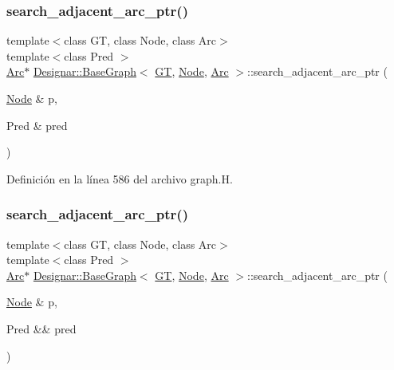 \subsubsection{\texorpdfstring{search\+\_\+adjacent\+\_\+arc\+\_\+ptr()}{search\_adjacent\_arc\_ptr()}\hspace{0.1cm}{\footnotesize\ttfamily [1/2]}}
{\footnotesize\ttfamily template$<$class GT, class Node, class Arc$>$ \\
template$<$class Pred $>$ \\
\hyperlink{namespace_designar_a3f55fb5513d62ff47cbc8f72b8e95d6f}{Arc}$\ast$ \hyperlink{class_designar_1_1_base_graph}{Designar\+::\+Base\+Graph}$<$ \hyperlink{demo-buildgraph_8_c_a3001c40d2c31ca87ed96cd7d1334a55e}{GT}, \hyperlink{namespace_designar_a5af326c65aa2bd26b26c410f2030d09e}{Node}, \hyperlink{namespace_designar_a3f55fb5513d62ff47cbc8f72b8e95d6f}{Arc} $>$\+::search\+\_\+adjacent\+\_\+arc\+\_\+ptr (\begin{DoxyParamCaption}\item[{\hyperlink{namespace_designar_a5af326c65aa2bd26b26c410f2030d09e}{Node} \&}]{p,  }\item[{Pred \&}]{pred }\end{DoxyParamCaption})\hspace{0.3cm}{\ttfamily [inline]}}



Definición en la línea 586 del archivo graph.\+H.

\mbox{\label{class_designar_1_1_base_graph_aac7ed362d5f21fcc6e583d4b9e03babb}} 
\subsubsection{\texorpdfstring{search\+\_\+adjacent\+\_\+arc\+\_\+ptr()}{search\_adjacent\_arc\_ptr()}\hspace{0.1cm}{\footnotesize\ttfamily [2/2]}}
{\footnotesize\ttfamily template$<$class GT, class Node, class Arc$>$ \\
template$<$class Pred $>$ \\
\hyperlink{namespace_designar_a3f55fb5513d62ff47cbc8f72b8e95d6f}{Arc}$\ast$ \hyperlink{class_designar_1_1_base_graph}{Designar\+::\+Base\+Graph}$<$ \hyperlink{demo-buildgraph_8_c_a3001c40d2c31ca87ed96cd7d1334a55e}{GT}, \hyperlink{namespace_designar_a5af326c65aa2bd26b26c410f2030d09e}{Node}, \hyperlink{namespace_designar_a3f55fb5513d62ff47cbc8f72b8e95d6f}{Arc} $>$\+::search\+\_\+adjacent\+\_\+arc\+\_\+ptr (\begin{DoxyParamCaption}\item[{\hyperlink{namespace_designar_a5af326c65aa2bd26b26c410f2030d09e}{Node} \&}]{p,  }\item[{Pred \&\&}]{pred }\end{DoxyParamCaption})\hspace{0.3cm}{\ttfamily [inline]}}



